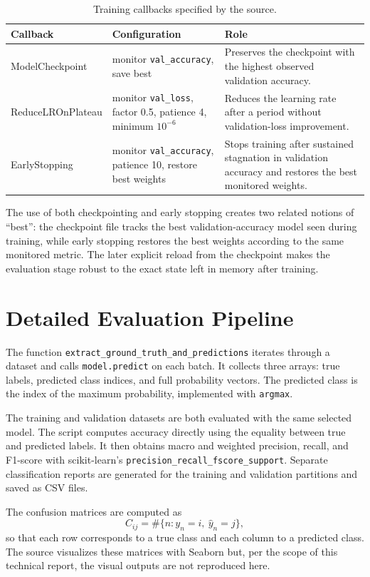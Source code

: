 \documentclass[11pt,a4paper]{article}
\newcommand{\code}[1]{\texttt{#1}}
\begin{document}
\begin{table}[ht]
\centering
\small
\begin{tabularx}{\textwidth}{p{} p{} X}
\toprule
Callback & Configuration & Role \\
\midrule
ModelCheckpoint & monitor \code{val\_accuracy}, save best & Preserves the checkpoint with the highest observed validation accuracy. \\
ReduceLROnPlateau & monitor \code{val\_loss}, factor 0.5, patience 4, minimum $10^{-6}$ & Reduces the learning rate after a period without validation-loss improvement. \\
EarlyStopping & monitor \code{val\_accuracy}, patience 10, restore best weights & Stops training after sustained stagnation in validation accuracy and restores the best monitored weights. \\
\bottomrule
\end{tabularx}
\caption{Training callbacks specified by the source.}
\end{table}

The use of both checkpointing and early stopping creates two related notions of ``best'': the checkpoint file tracks the best validation-accuracy model seen during training, while early stopping restores the best weights according to the same monitored metric. The later explicit reload from the checkpoint makes the evaluation stage robust to the exact state left in memory after training.

\section{Detailed Evaluation Pipeline}
The function \code{extract\_ground\_truth\_and\_predictions} iterates through a dataset and calls \code{model.predict} on each batch. It collects three arrays: true labels, predicted class indices, and full probability vectors. The predicted class is the index of the maximum probability, implemented with \code{argmax}.

The training and validation datasets are both evaluated with the same selected model. The script computes accuracy directly using the equality between true and predicted labels. It then obtains macro and weighted precision, recall, and F1-score with scikit-learn's \code{precision\_recall\_fscore\_support}. Separate classification reports are generated for the training and validation partitions and saved as CSV files.

The confusion matrices are computed as
\begin{equation}
C_{ij}
=
\#\{n : y_n=i,\ \hat{y}_n=j\},
\end{equation}
so that each row corresponds to a true class and each column to a predicted class. The source visualizes these matrices with Seaborn but, per the scope of this technical report, the visual outputs are not reproduced here.
\end{document}
